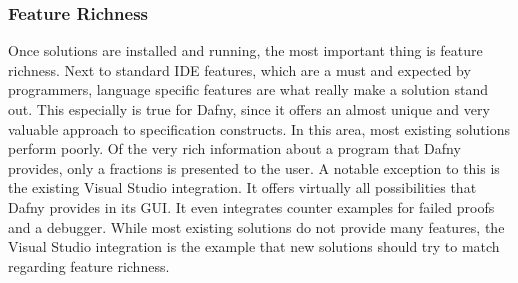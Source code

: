 \subsubsection{Feature Richness}
Once solutions are installed and running, the most important thing is feature richness. Next to standard IDE features, which are a must and expected by programmers, language specific features are what really make a solution stand out. This especially is true for Dafny, since it offers an almost unique and very valuable approach to specification constructs. In this area, most existing solutions perform poorly. Of the very rich information about a program that Dafny provides, only a fractions is presented to the user. \newline
A notable exception to this is the existing Visual Studio integration. It offers virtually all possibilities that Dafny provides in its GUI. It even integrates counter examples for failed proofs and a debugger. While most existing solutions do not provide many features, the Visual Studio integration is the example that new solutions should try to match regarding feature richness.

